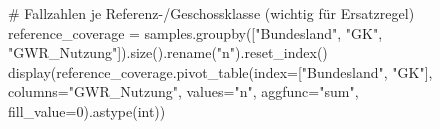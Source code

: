 \documentclass[
  ngerman,
  a4paper,
  DIV=11]{scrreprt}
\newenvironment{Shaded}{\begin{snugshade}}{\end{snugshade}}
\newcommand{\BuiltInTok}[1]{\textcolor[rgb]{0.00,0.23,0.31}{#1}}
\newcommand{\CommentTok}[1]{\textcolor[rgb]{0.37,0.37,0.37}{#1}}
\newcommand{\DecValTok}[1]{\textcolor[rgb]{0.68,0.00,0.00}{#1}}
\newcommand{\NormalTok}[1]{\textcolor[rgb]{0.00,0.23,0.31}{#1}}
\newcommand{\OperatorTok}[1]{\textcolor[rgb]{0.37,0.37,0.37}{#1}}
\newcommand{\StringTok}[1]{\textcolor[rgb]{0.13,0.47,0.30}{#1}}
\begin{document}
\begin{Shaded}
\begin{Highlighting}[]
\CommentTok{\# Fallzahlen je Referenz{-}/Geschossklasse (wichtig für Ersatzregel)}
\NormalTok{reference\_coverage }\OperatorTok{=}\NormalTok{ samples.groupby([}\StringTok{"Bundesland"}\NormalTok{, }\StringTok{"GK"}\NormalTok{, }\StringTok{"GWR\_Nutzung"}\NormalTok{]).size().rename(}\StringTok{"n"}\NormalTok{).reset\_index()}
\NormalTok{display(reference\_coverage.pivot\_table(index}\OperatorTok{=}\NormalTok{[}\StringTok{"Bundesland"}\NormalTok{, }\StringTok{"GK"}\NormalTok{], columns}\OperatorTok{=}\StringTok{"GWR\_Nutzung"}\NormalTok{,}
\NormalTok{                                       values}\OperatorTok{=}\StringTok{"n"}\NormalTok{, aggfunc}\OperatorTok{=}\StringTok{"sum"}\NormalTok{, fill\_value}\OperatorTok{=}\DecValTok{0}\NormalTok{).astype(}\BuiltInTok{int}\NormalTok{))}
\end{Highlighting}
\end{Shaded}
\end{document}
